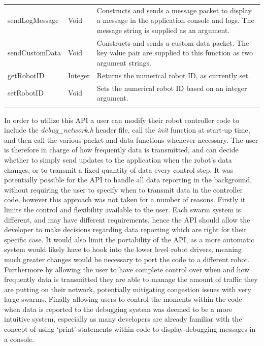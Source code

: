 \begin{longtable}{ l l p{8cm} }
 sendLogMessage & Void & Constructs and sends a message packet to display a message in the application console and logs. The message string is supplied as an argument.\\
 sendCustomData & Void & Constructs and sends a custom data packet. The key value pair are supplied to this function as two argument strings.\\
 getRobotID & Integer & Returns the numerical robot ID, as currently set. \\
 setRobotID & Void & Sets the numerical robot ID based on an integer argument. \\
 
 \label{tab:RobotAPI}
\end{longtable}

In order to utilize this API a user can modify their robot controller code to include the \textit{debug\_network.h} header file, call the \textit{init} function at start-up time, and then call the various packet and data functions whenever necessary. The user is therefore in charge of how frequently data is transmitted, and can decide whether to simply send updates to the application when the robot's data changes, or to transmit a fixed quantity of data every control step. It was potentially possible for the API to handle all data reporting in the background, without requiring the user to specify when to transmit data in the controller code, however this approach was not taken for a number of reasons. Firstly it limits the control and flexibility available to the user. Each swarm system is different, and may have different requirements, hence the API should allow the developer to make decisions regarding data reporting which are right for their specific case. It would also limit the portability of the API, as a more automatic system would likely have to hook into the lower level robot drivers, meaning much greater changes would be necessary to port the code to a different robot. Furthermore by allowing the user to have complete control over when and how frequently data is transmitted they are able to manage the amount of traffic they are putting on their network, potentially mitigating congestion issues with very large swarms. Finally allowing users to control the moments within the code when data is reported to the debugging system was deemed to be a more intuitive system, especially as many developers are already familiar with the concept of using `print' statements within code to display debugging messages in a console.


